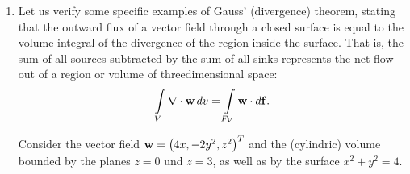 {\begin{enumerate}
\begin{eqnarray*}
\mbox{rot}{\bf w}& =& \nabla \times {\bf w}  \\
  \varepsilon_{ijk}\partial_j w_k & = &
   \equiv  \varepsilon_{ijk}
    \left[
      \left(-\frac{1}{r^2}\right)\left(\frac{1}{2r}\right)
      2 r_j p_k +
      \frac{1}{r}p_k'
      \left(-\frac{1}{c}\right)\left(\frac{1}{2r}\right)2r_j
    \right]= \\
  & = & -\frac{1}{r^3}\varepsilon_{ijk}r_j p_k -\frac{1}{cr^2}
    \varepsilon_{ijk}r_j p_k' = \\
  & \equiv & -\frac{1}{r^3}\left({\bf r} \times {\bf p}\right)-
    \frac{1}{cr^2}\left({\bf r} \times {\bf p}'\right)   .
\end{eqnarray*}

\item
Let us verify  some specific examples of Gauss' (divergence) theorem,
stating that the outward flux of a vector field through a closed surface
is equal to the volume integral of the divergence of the region inside the surface.
That is, the sum of all sources subtracted by the sum of all sinks represents the net flow out of a region or volume of threedimensional space:
\begin{equation}
\int \limits_V \nabla \cdot {\bf w} \, dv   =\int \limits_{F_V} {\bf w} \cdot d{\bf f}
.   \label{2011-m-gauss}
\end{equation}

Consider the vector field ${\bf w} = \begin{pmatrix} 4x , -2y^2 , z^2\end{pmatrix}^T$
and the (cylindric) volume bounded by the planes  $z=0$ und $z=3$,
as well as by the surface
$x^2 + y^2 = 4$.



\end{enumerate}}
